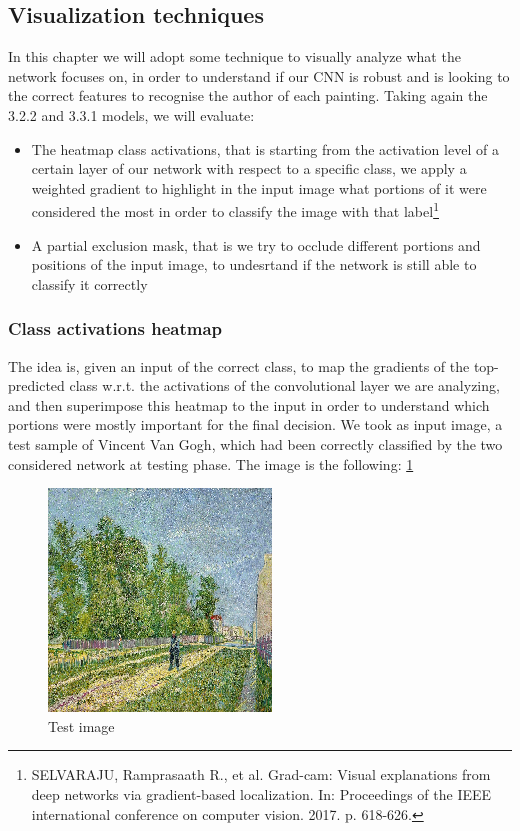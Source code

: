 \subsection{Visualization techniques}
In this chapter we will adopt some technique to visually analyze what the network focuses on, in order to understand if our CNN is robust and is looking to the correct features to recognise the author of each painting. Taking again the 3.2.2 and 3.3.1 models, we will evaluate:
\begin{itemize}
\item The heatmap class activations, that is starting from the activation level of a certain layer of our network with respect to a specific class, we apply a weighted gradient to highlight in the input image what portions of it were considered the most in order to classify the image with that label\footnote{SELVARAJU, Ramprasaath R., et al. Grad-cam: Visual explanations from deep networks via gradient-based localization. In: Proceedings of the IEEE international conference on computer vision. 2017. p. 618-626.}
\item A partial exclusion mask, that is we try to occlude different portions and positions of the input image, to undesrtand if the network is still able to classify it correctly
\end{itemize} 

\subsubsection{Class activations heatmap}
The idea is, given an input of the correct class, to map the gradients of the top-predicted class w.r.t. the activations of the convolutional layer we are analyzing, and then superimpose this heatmap to the input in order to understand which portions were mostly important for the final decision.
We took as input image, a test sample of Vincent Van Gogh, which had been correctly classified by the two considered network at testing phase. The image is the following: \ref{fig: Test_image_visualization}


\begin{figure}[H]
	\centering
	\includegraphics[height=0.6\textwidth]{img/scratch/visualization/test_image.png}
	\caption{Test image}
	\label{fig: Test_image_visualization}
\end{figure}

